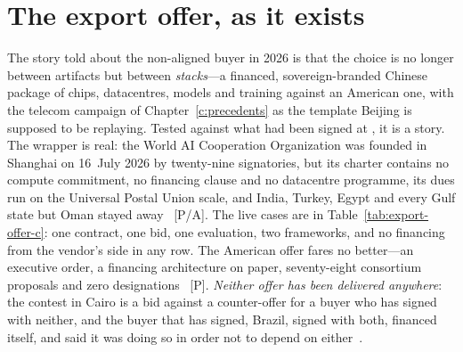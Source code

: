 \section{The export offer, as it exists}
\label{c:export-offer}

The story told about the non-aligned buyer in 2026 is that the choice is no longer between artifacts but between \emph{stacks}---a financed, sovereign-branded Chinese package of chips, datacentres, models and training against an American one, with the telecom campaign of Chapter~\ref{c:precedents} as the template Beijing is supposed to be replaying. Tested against what had been signed at \datafreeze, it is a story. The wrapper is real: the World AI Cooperation Organization was founded in Shanghai on 16~July 2026 by twenty-nine signatories, but its charter contains no compute commitment, no financing clause and no datacentre programme, its dues run on the Universal Postal Union scale, and India, Turkey, Egypt and every Gulf state but Oman stayed away~\cite{waico} [P/A]. The live cases are in Table~\ref{tab:export-offer-c}: one contract, one bid, one evaluation, two frameworks, and no financing from the vendor's side in any row. The American offer fares no better---an executive order, a financing architecture on paper, seventy-eight consortium proposals and zero designations~\cite{us-ai-exports} [P]. \emph{Neither offer has been delivered anywhere}: the contest in Cairo is a bid against a counter-offer for a buyer who has signed with neither, and the buyer that has signed, Brazil, signed with both, financed itself, and said it was doing so in order not to depend on either~\cite{brazil-ai-supercomputer}.

